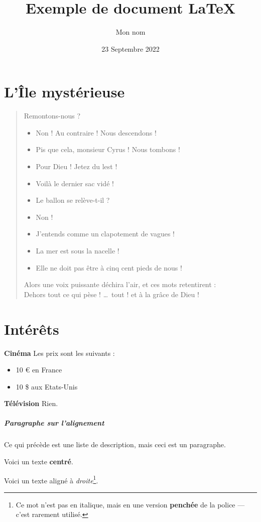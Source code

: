 \documentclass{scrartcl}
\title{\textbf{\textrm{Exemple de document \LaTeX}}}
\author{Mon nom}
\date{23 Septembre 2022}
\begin{document}
\maketitle

\raggedright\section{\textrm{L'Île mystérieuse}}
\begin{quotation}
\og Remontons-nous ?
\begin{itemize}
    \item Non ! Au contraire ! Nous descendons !
    \item Pis que cela, monsieur Cyrus ! Nous tombons !
    \item Pour Dieu ! Jetez du lest !   
    \item Voilà le dernier sac vidé !
    \item Le ballon se relève-t-il ? 
    \item Non !
    \item J’entends comme un clapotement de vagues !
    \item La mer est sous la nacelle !
    \item Elle ne doit pas être à cinq cent pieds de nous !\fg
\end{itemize}

Alors une voix puissante déchira l'air, et ces mots retentirent :\\
\og Dehors tout ce qui pèse ! \ldots ~tout ! et à la grâce de Dieu !\fg
\end{quotation}

\section{\textrm{Intérêts}}
\indent\textbf{Cinéma} Les prix sont les suivants :
\begin{itemize}
    \item 10 € en France
    \item 10 \$ aux Etats-Unis
\end{itemize}

\indent\textbf{Télévision} Rien.

\subparagraph*{Paragraphe sur l'alignement} Ce qui précède est une liste de description, mais ceci est un paragraphe.
\begin{center}
    Voici un texte \textbf{centré}.
\end{center}
\raggedleft Voici un texte aligné à \textsl{droite}\footnote{Ce mot n'est pas en italique, mais en une version \textbf{penchée} de la police --- c'est rarement utilisé.}.
\end{document}
